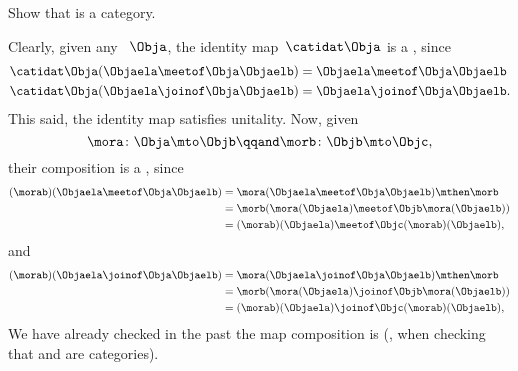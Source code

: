 \begin{exercise}
    \label{ex:lat_is_cat}
    Show that \Lat is a category.
\end{exercise}
\begin{solution}
    Clearly, given any ~$\Obja$, the identity map~$\catidat\Obja$ is a , since
    \begin{equation}
        \begin{aligned}
            \catidat\Obja(\Objaela \meetof\Obja \Objaelb) & =\Objaela \meetof\Obja \Objaelb \\
            \catidat\Obja(\Objaela \joinof\Obja \Objaelb) & =\Objaela \joinof\Obja \Objaelb.
        \end{aligned}
    \end{equation}
    This said, the identity map satisfies unitality.
    Now, given 
    \begin{equation}
        \mora\colon \Obja \mto \Objb
        \qqand
        \morb\colon \Objb\mto \Objc,
    \end{equation}
    their composition is a , since
    \begin{equation}
        \begin{aligned}
            (\morab)(\Objaela \meetof\Obja \Objaelb)
             & = \mora(\Objaela \meetof\Obja \Objaelb) \mthen \morb \\
             & = \morb(\mora(\Objaela) \meetof\Objb \mora(\Objaelb)) \\
             & =(\morab)(\Objaela) \meetof\Objc (\morab)(\Objaelb),
        \end{aligned}
    \end{equation}
    and
    \begin{equation}
        \begin{aligned}
            (\morab)(\Objaela \joinof\Obja \Objaelb)
             & = \mora(\Objaela \joinof\Obja \Objaelb) \mthen \morb \\
             & = \morb(\mora(\Objaela) \joinof\Objb \mora(\Objaelb)) \\
             & =(\morab)(\Objaela) \joinof\Objc (\morab)(\Objaelb),
        \end{aligned}
    \end{equation}
    We have already checked in the past the map composition is  (\eg, when checking that \Set and \Pos are categories).
\end{solution}

